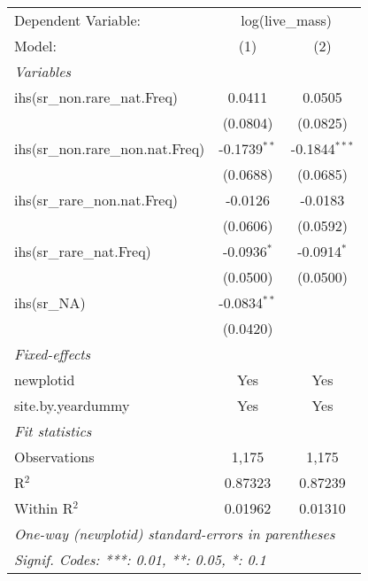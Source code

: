 \begin{tabular}{lcc}
\tabularnewline\midrule\midrule
Dependent Variable:&\multicolumn{2}{c}{log(live\_mass)}\\
Model:&(1) & (2)\\
\midrule \emph{Variables}&   &  \\
ihs(sr\_non.rare\_nat.Freq)&0.0411 & 0.0505\\
  &(0.0804) & (0.0825)\\
ihs(sr\_non.rare\_non.nat.Freq)&-0.1739$^{**}$ & -0.1844$^{***}$\\
  &(0.0688) & (0.0685)\\
ihs(sr\_rare\_non.nat.Freq)&-0.0126 & -0.0183\\
  &(0.0606) & (0.0592)\\
ihs(sr\_rare\_nat.Freq)&-0.0936$^{*}$ & -0.0914$^{*}$\\
  &(0.0500) & (0.0500)\\
ihs(sr\_NA)&-0.0834$^{**}$ &   \\
  &(0.0420) &   \\
\midrule \emph{Fixed-effects}&   &  \\
newplotid & Yes & Yes\\
site.by.yeardummy & Yes & Yes\\
\midrule \emph{Fit statistics}&  & \\
Observations & 1,175&1,175\\
R$^2$ & 0.87323&0.87239\\
Within R$^2$ & 0.01962&0.01310\\
\midrule\midrule\multicolumn{3}{l}{\emph{One-way (newplotid) standard-errors in parentheses}}\\
\multicolumn{3}{l}{\emph{Signif. Codes: ***: 0.01, **: 0.05, *: 0.1}}\\
\end{tabular}


